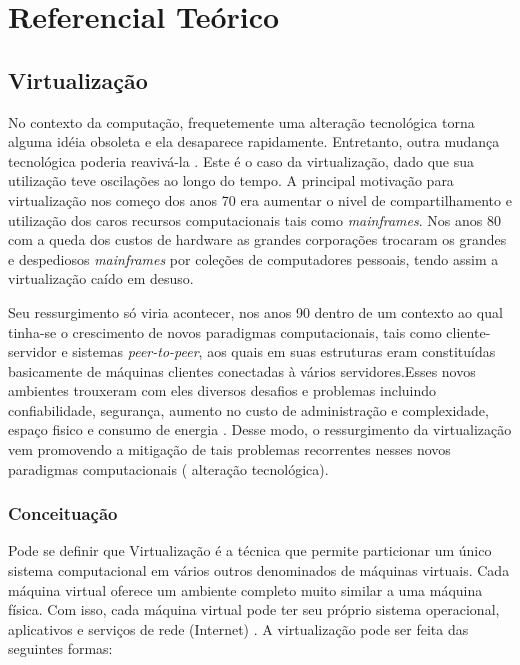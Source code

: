 \chapter{Referencial Teórico}
\label{cap:referencial_teorico}
\section{Virtualização}
No contexto da computação, frequetemente uma alteração tecnológica torna alguma idéia obsoleta e ela desaparece rapidamente. Entretanto, outra mudança tecnológica poderia reavivá-la \cite{tanembaum}. Este é o caso da virtualização, dado que sua utilização teve oscilações ao longo do tempo. A principal motivação para virtualização nos começo dos anos 70 era aumentar o nivel de compartilhamento e utilização dos caros recursos computacionais tais como \textit{mainframes}\cite{menasce}. Nos anos 80 com a queda dos custos de hardware as grandes corporações trocaram os grandes e despediosos \textit{mainframes} por coleções de computadores pessoais, tendo assim a virtualização caído em desuso.

 Seu ressurgimento só viria acontecer, nos anos 90 dentro de um contexto ao qual tinha-se o crescimento de novos paradigmas computacionais, tais como cliente-servidor  e sistemas \textit{peer-to-peer}, aos quais em suas estruturas eram constituídas basicamente de máquinas clientes conectadas à vários servidores.Esses novos ambientes trouxeram com eles diversos desafios e problemas incluindo confiabilidade, segurança, aumento no custo de administração e complexidade, espaço fisico e consumo de energia \cite{menasce}. Desse modo, o ressurgimento da virtualização vem promovendo a mitigação de tais problemas recorrentes nesses novos paradigmas computacionais ( alteração tecnológica).
 
\subsection{Conceituação}
Pode se definir que Virtualização é a técnica que permite particionar um único sistema computacional em vários outros denominados de máquinas virtuais. Cada máquina virtual oferece um ambiente completo muito similar a uma máquina física. Com isso, cada máquina virtual pode ter seu próprio sistema operacional, aplicativos e serviços de rede (Internet) \cite{carissimi}. A virtualização pode ser feita das seguintes formas:

